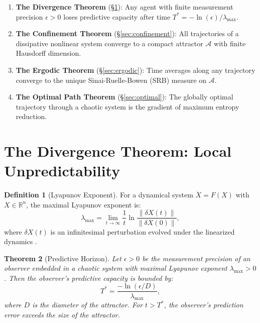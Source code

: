 \documentclass[12pt, a4paper]{article}
\theoremstyle{plain}
\newtheorem{theorem}{Theorem}[section]
\theoremstyle{definition}
\newtheorem{definition}[theorem]{Definition}
\theoremstyle{remark}
\newcommand{\R}{\mathbb{R}}
\newcommand{\calA}{\mathcal{A}}
\begin{document}
\begin{enumerate}
  \item \textbf{The Divergence Theorem} (\S\ref{sec:lyapunov}): Any
    agent with finite measurement precision $\epsilon > 0$ loses
    predictive capacity after time $T^* = -\ln(\epsilon) / \lambda_{\max}$.

  \item \textbf{The Confinement Theorem} (\S\ref{sec:confinement}): All
    trajectories of a dissipative nonlinear system converge to a compact
    attractor $\calA$ with finite Hausdorff dimension.

  \item \textbf{The Ergodic Theorem} (\S\ref{sec:ergodic}): Time averages
    along any trajectory converge to the unique Sinai-Ruelle-Bowen (SRB)
    measure on $\calA$.

  \item \textbf{The Optimal Path Theorem} (\S\ref{sec:optimal}): The
    globally optimal trajectory through a chaotic system is the gradient
    of maximum entropy reduction.
\end{enumerate}

\section{The Divergence Theorem: Local Unpredictability}\label{sec:lyapunov}

\begin{definition}[Lyapunov Exponent]\label{def:lyapunov}
  For a dynamical system $\dot{X} = F(X)$ with $X \in \R^n$, the maximal
  Lyapunov exponent is:
  \begin{equation}
    \lambda_{\max} = \lim_{t \to \infty} \frac{1}{t} \ln
    \frac{\|\delta X(t)\|}{\|\delta X(0)\|},
  \end{equation}
  where $\delta X(t)$ is an infinitesimal perturbation evolved under the
  linearized dynamics \citep{Oseledets1968}.
\end{definition}

\begin{theorem}[Predictive Horizon]\label{thm:horizon}
  Let $\epsilon > 0$ be the measurement precision of an observer embedded
  in a chaotic system with maximal Lyapunov exponent $\lambda_{\max} > 0$.
  Then the observer's predictive capacity is bounded by:
  \begin{equation}\label{eq:horizon}
    T^* = \frac{-\ln(\epsilon / D)}{\lambda_{\max}},
  \end{equation}
  where $D$ is the diameter of the attractor. For $t > T^*$, the
  observer's prediction error exceeds the size of the attractor.
\end{theorem}
\end{document}

